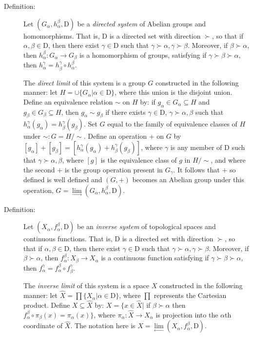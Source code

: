\documentclass{article}
\def\plim{\lim\limits_{\leftarrow}^{}}
\def\dlim{\lim\limits_{ \rightarrow}^{}}
\begin{document}
\begin{description}

\item[Definition:] Let $(G_{\alpha}, h_{\alpha}^{\beta}, \text{D})$ be a \emph{directed system} of Abelian groups and homomorphisms. That is, $\text{D}$ is a directed set with direction $\succ$, so that if $\alpha,\beta \in \text{D}$, then there exist $\gamma \in \text{D}$ such that $\gamma \succ \alpha, \gamma \succ \beta$. Moreover, if $\beta \succ \alpha$, then $h_{\alpha}^{\beta}: G_{\alpha} \longrightarrow G_{\beta}$ is a homomorphism of groups, satisfying if $\gamma \succ \beta \succ \alpha$, then $h_{\alpha}^{\gamma} = h_{\beta}^{\gamma} \circ h_{\alpha}^{\beta}$.

  The \emph{direct limit} of this system is a group $G$ constructed in the following manner: let $H= \cup \{ G_{\alpha} \vert \alpha \in \text{D} \}$, where this union is the disjoint union. Define an equivalence relation $\sim$ on $H$ by: if $g_{\alpha} \in G_{\alpha} \subseteq H$ and $g_{\beta} \in G_{\beta} \subseteq H$, then $g_{\alpha}\sim g_{\beta}$ if there exists $\gamma \in \text{D}$, $\gamma \succ \alpha,\beta$ such that $h_{\alpha}^{\gamma} (g_{\alpha}) = h_{\beta}^{\gamma} (g_{\beta})$. Set $G$ equal to the family of equivalence classes of $H$ under $\sim: G = H/\sim$. Define an operation + on $G$ by $[g_{\alpha}]+[g_{\beta}]=[h_{\alpha}^{\gamma} (g_{\alpha})+h_{\beta}^{\gamma}(g_{\beta})]$, where $\gamma$ is any member of $\text{D}$ such that $\gamma \succ \alpha,\beta$, where $[g]$ is the equivalence class of $g$ in $H/\sim$, and where the second $+$ is the group operation present in $G_{\gamma}$. It follows that $+$ so defined is well defined and $(G,+)$ becomes an Abelian group under this operation, $G = \dlim (G_{\alpha}, h_{\alpha}^{\beta}, \text{D})$.

\item[Definition:] Let $(X_{\alpha},f_{\alpha}^{\beta},\text{D})$ be an \emph{inverse system} of topological spaces and continuous functions. That is, $\text{D}$ is a directed set with direction $\succ$, so that if $\alpha,\beta \in \text{D}$, then there exist $\gamma \in \text{D}$ such that $\gamma \succ \alpha, \gamma \succ \beta$. Moreover, if $\beta \succ \alpha$, then $f_{\alpha}^{\beta}: X_{\beta} \longrightarrow X_{\alpha}$ is a continuous function satisfying if $\gamma \succ \beta \succ \alpha$, then $f_{\alpha}^{\gamma} = f_{\alpha}^{\beta} \circ f_{\beta}^{\gamma}$.

  The \emph{inverse limit} of this system is a space $X$ constructed in the following manner: let $\widehat{X}= \prod \{ X_{\alpha} \vert \alpha \in \text{D} \}$, where $\prod$ represents the Cartesian product. Define $X \subseteq \widehat{X}$ by: $X= \{ x \in \widehat{X} \vert$ if $\beta \succ \alpha$ then $f_{\alpha}^{\beta} \circ \pi_{\beta}(x) = \pi_{\alpha}(x) \}$, where $\pi_{\alpha}: \widehat{X} \longrightarrow X_{\alpha}$ is projection into the $\alpha$th coordinate of $\widehat{X}$. The notation here is $X = \plim (X_{\alpha}, f_{\alpha}^{\beta}, \text{D})$.


\end{description}
\end{document}

